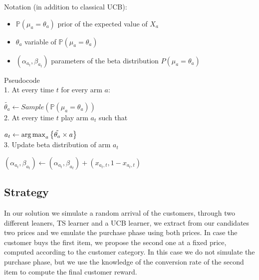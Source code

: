 Notation (in addition to classical UCB):\\
\begin{itemize}
	\item $\mathbb P(\mu_{a}=\theta_{a})$ prior of the expected value of $X_{a}$
	\item $\theta_{a}$ variable of $\mathbb P(\mu_{a}=\theta_{a})$
	\item $(\alpha_{a_{t}}, \beta_{a_{t}})$ parameters of the beta distribution $P(\mu_{a}=\theta_{a})$
\end{itemize}

Pseudocode\\

1. At every time $t$ for every arm $a$:

\hspace{2em}$\tilde{\theta_{a}} \leftarrow Sample(\mathbb P(\mu_{a}=\theta_{a}))$ \\

2. At every time $t$ play arm $a_{t}$ such that 

\hspace{2em}$a_{t} \leftarrow \operatorname{arg\,max}_a \left\{ \tilde{\theta_{a}} \times a \right\} $ \\

3.  Update beta distribution of arm $a_{t}$

\hspace{2em}$(\alpha_{a_{t}}, \beta_{a_{t}}) \leftarrow (\alpha_{a_{t}}, \beta_{a_{t}}) + (x_{a_{t},t}, 1 - x_{a_{t},t})$


\subsection*{Strategy}

In our solution we simulate a random arrival of the customers, through two different leaners, TS learner and a UCB learner, we extract from our candidates two prices and we emulate the purchase phase using both prices. In case the customer buys the first item, we propose the second one at a fixed price, computed according to the customer category. In this case we do not simulate the purchase phase, but we use the knowledge of the conversion rate of the second item to compute the final customer reward. 

